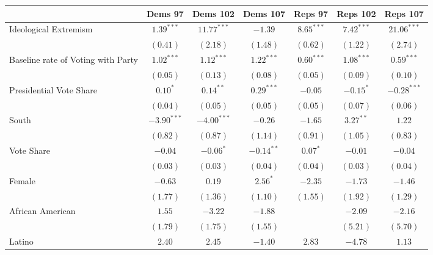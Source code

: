 \documentclass[12pt]{article}
\begin{document}
\begin{table}
	\begin{center}
		\begin{tabular}{l c c c c c c }
			\hline
			& Dems 97 & Dems 102 & Dems 107 & Reps 97 & Reps 102 & Reps 107 \\
			\hline
			Ideological Extremism & $1.39^{***}$  & $11.77^{***}$ & $-1.39$        & $8.65^{***}$   & $7.42^{***}$   & $21.06^{***}$  \\
			& $(0.41)$      & $(2.18)$      & $(1.48)$       & $(0.62)$       & $(1.22)$       & $(2.74)$       \\
			Baseline rate of Voting with Party              & $1.02^{***}$  & $1.12^{***}$  & $1.22^{***}$   & $0.60^{***}$   & $1.08^{***}$   & $0.59^{***}$   \\
			& $(0.05)$      & $(0.13)$      & $(0.08)$       & $(0.05)$       & $(0.09)$       & $(0.10)$       \\
			Presidential Vote Share                   & $0.10^{*}$    & $0.14^{**}$   & $0.29^{***}$   & $-0.05$        & $-0.15^{*}$    & $-0.28^{***}$  \\
			& $(0.04)$      & $(0.05)$      & $(0.05)$       & $(0.05)$       & $(0.07)$       & $(0.06)$       \\
			South                     & $-3.90^{***}$ & $-4.00^{***}$ & $-0.26$        & $-1.65$        & $3.27^{**}$    & $1.22$         \\
			& $(0.82)$      & $(0.87)$      & $(1.14)$       & $(0.91)$       & $(1.05)$       & $(0.83)$       \\
			Vote Share                  & $-0.04$       & $-0.06^{*}$   & $-0.14^{**}$   & $0.07^{*}$     & $-0.01$        & $-0.04$        \\
			& $(0.03)$      & $(0.03)$      & $(0.04)$       & $(0.04)$       & $(0.03)$       & $(0.04)$       \\
			Female               & $-0.63$       & $0.19$        & $2.56^{*}$     & $-2.35$        & $-1.73$        & $-1.46$        \\
			& $(1.77)$      & $(1.36)$      & $(1.10)$       & $(1.55)$       & $(1.92)$       & $(1.29)$       \\
			African American        & $1.55$        & $-3.22$       & $-1.88$        &                & $-2.09$        & $-2.16$        \\
			& $(1.79)$      & $(1.75)$      & $(1.55)$       &                & $(5.21)$       & $(5.70)$       \\
			Latino          &   $2.40$        & $2.45$        & $-1.40$        & $2.83$         & $-4.78$        & $1.13$         \\

\end{tabular}
\end{center}
\end{table}
\end{document}
